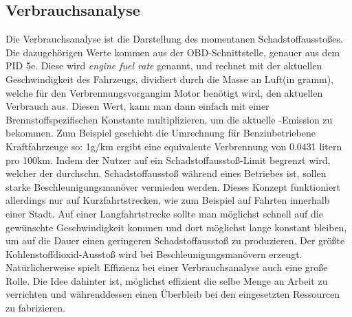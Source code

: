\subsection{Verbrauchsanalyse}

Die Verbrauchsanalyse ist die Darstellung des momentanen Schadstoffausstoßes.
Die dazugehörigen Werte kommen aus der OBD-Schnittstelle, genauer aus dem PID 5e.
Diese wird \textit{engine fuel rate} genannt, und rechnet mit der 
aktuellen Geschwindigkeit des Fahrzeugs, dividiert durch die Masse an Luft(in gramm), 
welche für den Verbrennungsvorgangim Motor benötigt wird,
den aktuellen Verbrauch aus. Diesen Wert, kann man dann einfach mit einer Brennstoffspezifischen
Konstante multiplizieren, um die aktuelle -Emission zu bekommen.
Zum Beispiel geschieht die Umrechnung für Benzinbetriebene Kraftfahrzeuge so:
1g/km  ergibt eine equivalente Verbrennung von 0.0431 litern pro 100km. 
Indem der Nutzer auf ein Schadstoffausstoß-Limit begrenzt wird, welcher der durchschn.
Schadstoffausstoß während eines Betriebes ist, sollen starke Beschleunigungsmanöver 
vermieden werden. Dieses Konzept funktioniert allerdings nur auf Kurzfahrtstrecken,
wie zum Beispiel auf Fahrten innerhalb einer Stadt.
Auf einer Langfahrtstrecke sollte man möglichst schnell auf die gewünschte Geschwindigkeit kommen
und dort möglichst lange konstant bleiben, um auf die Dauer einen geringeren Schadstoffausstoß zu produzieren.
Der größte Kohlenstoffdioxid-Ausstoß wird bei Beschleunigungsmanövern erzeugt.
Natürlicherweise spielt Effizienz bei einer Verbrauchsanalyse auch eine große Rolle.
Die Idee dahinter ist, möglichst effizient die selbe Menge an Arbeit zu verrichten und währenddessen einen Überbleib
bei den eingesetzten Ressourcen zu fabrizieren. 

